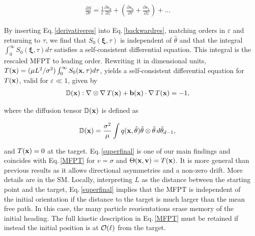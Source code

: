 \documentclass[
 reprint,










 amsmath,amssymb,
 aps, prl,






longbibliography
]{revtex4-2}
\begin{document}
\begin{eqnarray}
\label{derivativeres}
\frac{\partial S} {\partial \tau} = \frac 1 {\varepsilon} \frac{\partial s_0}  {\partial z} +
 \left( \frac{\partial s_0}{\partial \tau } + \frac{\partial s_1} {\partial z} \right)+
\dots
 \end{eqnarray}

By inserting Eq.\,\ref{derivativeres} into Eq.\,\ref{backwardres},
matching orders in $\varepsilon$ and returning to $\tau$,
we find that $S_0({\bm {\xi}}, \tau)$  is independent
of $\hat \theta$ and that the integral $\int_0^{\infty} S_0 ({\bm {\xi}}, \tau) d\tau$ satisfies a self-consistent differential equation.
This integral is the rescaled MFPT to leading order.  Rewriting it in dimensional units, $T({\bf {x}}) = (\mu L^2 /\sigma^2) \int_0^{\infty} S_0 ({\bf {x}}, \tau) d\tau $, yields a self-consistent differential equation for $T({\bf x})$,
valid for $\varepsilon \ll 1$, given by
\begin{eqnarray}
\label{superfinal}
{\mathbb D}({\bf {x}}) : \nabla \otimes \nabla \,
T({\bf {x}})
+ {\bf {b}}({\bf {x}}) \cdot \nabla \, T({\bf {x}}) = -1,
\end{eqnarray}

where the diffusion tensor ${\mathbb D}({\bf {x}})$ is defined as

\begin{eqnarray}
\label{difftensor}
{\mathbb D}({\bf {x}}) = \frac{\sigma^2}{\mu} \int  q ({\bf {x}}, \hat \theta) \hat \theta \otimes \hat \theta \,  d \hat \theta_{d-1},
\end{eqnarray}

and $T({\bf x}) =0$ at the target. Eq.\,\ref{superfinal} is one of our main findings and coincides with Eq.\,\ref{MFPT} for $v = \sigma$ and $\Theta({\bf {x}}, {\bf v})= T({\bf x})$.
It is more general than previous results as it allows directional asymmetries and a non-zero drift.
More details are in the SM. Locally, interpreting $L$ as the distance between the starting point and the target,
Eq.\,\ref{superfinal}
implies that the MFPT is independent of the initial orientation
if the distance to the target is much larger than the mean free path.
In this case, the many particle reorientations erase memory of the initial heading. The full kinetic description in
Eq.\,\ref{MFPT} must be retained if instead
the initial position is at ${\cal O}(\ell)$ from the target.
\end{document}
